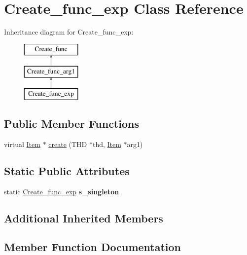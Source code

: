 \hypertarget{classCreate__func__exp}{}\section{Create\+\_\+func\+\_\+exp Class Reference}
\label{classCreate__func__exp}
Inheritance diagram for Create\+\_\+func\+\_\+exp\+:\begin{figure}[H]
\begin{center}
\leavevmode
\includegraphics[height=3.000000cm]{classCreate__func__exp}
\end{center}
\end{figure}
\subsection*{Public Member Functions}
\begin{DoxyCompactItemize}
\item 
virtual \mbox{\hyperlink{classItem}{Item}} $\ast$ \mbox{\hyperlink{classCreate__func__exp_a71f0b5f5a50e8e474b64344f758a4ba3}{create}} (T\+HD $\ast$thd, \mbox{\hyperlink{classItem}{Item}} $\ast$arg1)
\end{DoxyCompactItemize}
\subsection*{Static Public Attributes}
\begin{DoxyCompactItemize}
\item 
\mbox{\label{classCreate__func__exp_a6848dcebff02492b950300c4bf9e1755}} 
static \mbox{\hyperlink{classCreate__func__exp}{Create\+\_\+func\+\_\+exp}} {\bfseries s\+\_\+singleton}
\end{DoxyCompactItemize}
\subsection*{Additional Inherited Members}


\subsection{Member Function Documentation}
\mbox{\label{classCreate__func__exp_a71f0b5f5a50e8e474b64344f758a4ba3}} 
